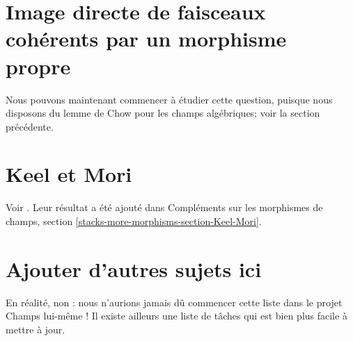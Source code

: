 \section{Image directe de faisceaux cohérents par un morphisme propre}
\label{section-proper-pushforward}

\noindent
Nous pouvons maintenant commencer à étudier cette question, puisque nous disposons du lemme de Chow pour
les champs algébriques; voir la section précédente.


\section{Keel et Mori}
\label{section-keel-mori}

\noindent
Voir \cite{K-M}. Leur résultat a été ajouté dans
Compléments sur les morphismes de champs, section
\ref{stacks-more-morphisms-section-Keel-Mori}.


\section{Ajouter d'autres sujets ici}
\label{section-add-more}

\noindent
En réalité, non : nous n'aurions jamais dû commencer cette liste dans le
projet Champs lui-même ! Il existe ailleurs une liste de tâches
qui est bien plus facile à mettre à jour.









